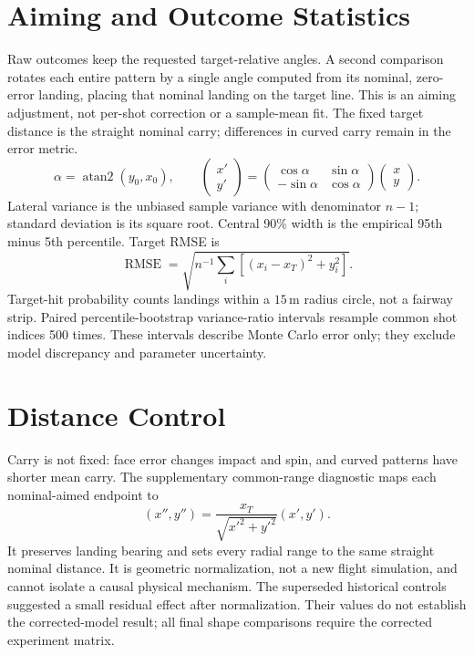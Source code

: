 \documentclass[11pt,letterpaper]{article}
\begin{document}
\section{Aiming and Outcome Statistics}
Raw outcomes keep the requested target-relative angles. A second comparison
rotates each entire pattern by a single angle computed from its nominal,
zero-error landing, placing that nominal landing on the target line. This is
an aiming adjustment, not per-shot correction or a sample-mean fit. The
fixed target distance is the straight nominal carry; differences in curved
carry remain in the error metric.
\[
 \alpha=\operatorname{atan2}(y_0,x_0),\qquad
 \begin{pmatrix}x'\\y'\end{pmatrix}=
 \begin{pmatrix}\cos\alpha&\sin\alpha\\-\sin\alpha&\cos\alpha\end{pmatrix}
 \begin{pmatrix}x\\y\end{pmatrix}.
\]
Lateral variance is the unbiased sample variance with denominator $n-1$;
standard deviation is its square root. Central 90\% width is the empirical
95th minus 5th percentile. Target RMSE is
\[\operatorname{RMSE}=\sqrt{n^{-1}\sum_i[(x_i-x_T)^2+y_i^2]}.\] Target-hit probability counts
landings within a $15\,\mathrm m$ radius circle, not a fairway strip.
Paired percentile-bootstrap variance-ratio intervals resample common shot
indices 500 times. These intervals describe Monte Carlo error only; they
exclude model discrepancy and parameter uncertainty.

\section{Distance Control}
Carry is not fixed: face error changes impact and spin, and curved patterns
have shorter mean carry. The supplementary common-range diagnostic maps each
nominal-aimed endpoint to
\[
 (x'',y'')=\frac{x_T}{\sqrt{x'^2+y'^2}}(x',y').
\]
It preserves landing bearing and sets every radial range to the same straight
nominal distance. It is geometric normalization, not a new flight simulation,
and cannot isolate a causal physical mechanism. The superseded historical controls suggested a small residual effect after
normalization. Their values do not establish the corrected-model result; all
final shape comparisons require the corrected experiment matrix.
\end{document}
